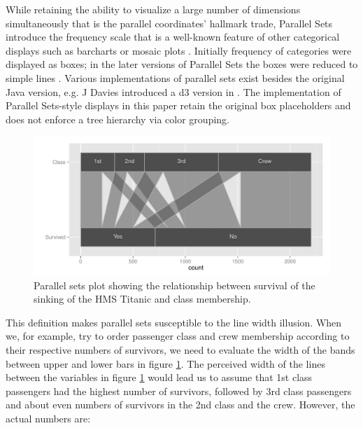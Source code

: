   While retaining the %
ability to visualize a large number of dimensions simultaneously that is the parallel coordinates' hallmark trade, Parallel Sets introduce the frequency scale that is a well-known feature of other categorical displays such as barcharts or mosaic plots \citep{hartigan:1981, friendly:1992, hofmann:2000, theus:1997}.
 Initially frequency of categories  were displayed as boxes; in the later versions of Parallel Sets the boxes were reduced to simple lines \citep{parsetredesign}. Various implementations of parallel sets exist besides the original Java version, e.g.  J Davies introduced a d3 \citep{d3} version in  \citep{davies}.  The implementation of Parallel Sets-style displays in this paper retain the original box placeholders and does not enforce a tree hierarchy via color grouping. %



\begin{figure}[hbtp]
\centering
\includegraphics[width=.9\linewidth]{images/parset-titanic}
\caption{\label{question1a} Parallel sets plot showing the relationship between survival of the sinking of the HMS Titanic and class membership. }
\end{figure}


This definition makes parallel sets susceptible to the line width illusion. When we, for example, try to order passenger class and crew membership according to their respective numbers of survivors, we need to evaluate the width of the bands between upper and lower bars in figure \ref{question1a}.
The  perceived width of the lines between the variables in figure \ref{question1a} would  lead us to assume that 1st class passengers had the highest number of survivors, followed by 3rd class passengers and about even numbers of survivors in the 2nd class  and  the crew. However, the  actual numbers are:


